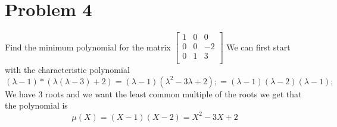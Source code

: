 \documentclass{article}
\begin{document}
\section*{Problem 4}
Find the minimum polynomial for the matrix $\begin{bmatrix} 1 & 0 & 0 \\ 0 & 0 & -2 \\ 0 & 1 & 3 \\ \end{bmatrix}$
\newline
\newline
We can first start with the characteristic polynomial
$$
(\lambda-1)*(\lambda(\lambda-3) + 2)
=
(\lambda - 1)(\lambda^2-3\lambda + 2);
=
(\lambda-1)(\lambda - 2)(\lambda - 1);
$$
We have $3$ roots and we want the least common multiple of the roots we get that the polynomial is
$$\mu(X)=(X-1)(X-2) = X^2 -3X +2$$
\end{document}
